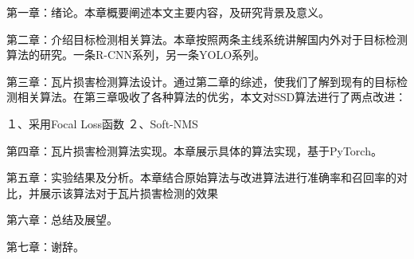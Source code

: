 第一章：绪论。本章概要阐述本文主要内容，及研究背景及意义。

第二章：介绍目标检测相关算法。本章按照两条主线系统讲解国内外对于目标检测算法的研究。一条R-CNN系列，另一条YOLO系列。

第三章：瓦片损害检测算法设计。通过第二章的综述，使我们了解到现有的目标检测相关算法。在第三章吸收了各种算法的优劣，本文对SSD算法进行了两点改进：

１、采用Focal Loss函数
２、Soft-NMS

第四章：瓦片损害检测算法实现。本章展示具体的算法实现，基于PyTorch。

第五章：实验结果及分析。本章结合原始算法与改进算法进行准确率和召回率的对比，并展示该算法对于瓦片损害检测的效果　

第六章：总结及展望。

第七章：谢辞。